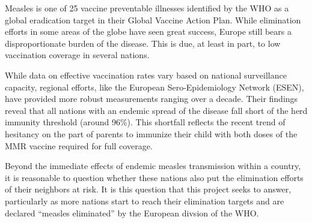 \documentclass[../Paper.tex]{subfiles}
\begin{document}
\raggedright
Measles is one of 25 vaccine preventable illnesses identified by the WHO as a
global eradication target in their Global Vaccine Action Plan. While elimination
efforts in some areas of the globe have seen great success, Europe still bears a
disproportionate burden of the disease. This is due, at least in part, to low
vaccination coverage in several nations\cite{world_health_organization_2017}.

While data on effective vaccination rates vary based on national surveillance
capacity, regional efforts, like the European Sero-Epidemiology Network (ESEN),
have provided more robust measurements ranging over a decade. Their findings
reveal that all nations with an endemic spread of the disease fall short of the
herd immunity threshold (around 96\%)\cite{andrews_tischer_siedler_pebody_2008}.
This shortfall reflects the recent trend of hesitancy on the part of parents to
immunize their child with both doses of the MMR vaccine required for full coverage.

Beyond the immediate effects of endemic measles transmission within a country,
it is reasonable to question whether these nations also put the elimination efforts
of their neighbors at risk. It is this question that this project seeks to answer,
particularly as more nations start to reach their elimination targets and are declared
``measles eliminated'' by the European divsion of the WHO\cite{sniadack_crowcroft_durrheim_rota_2017}.

\clearpage
\end{document}
